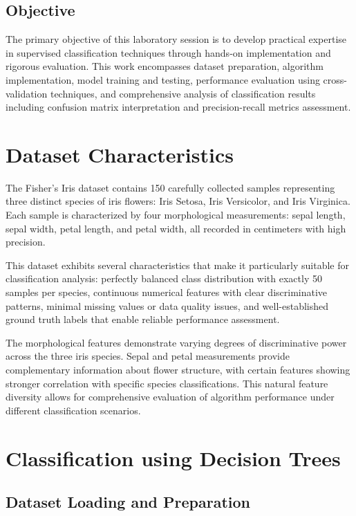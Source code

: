 \documentclass[12pt,a4paper]{article}
\begin{document}
\subsection{Objective}
The primary objective of this laboratory session is to develop practical expertise in supervised classification techniques through hands-on implementation and rigorous evaluation. This work encompasses dataset preparation, algorithm implementation, model training and testing, performance evaluation using cross-validation techniques, and comprehensive analysis of classification results including confusion matrix interpretation and precision-recall metrics assessment.
\section{Dataset Characteristics}

The Fisher's Iris dataset contains 150 carefully collected samples representing three distinct species of iris flowers: Iris Setosa, Iris Versicolor, and Iris Virginica. Each sample is characterized by four morphological measurements: sepal length, sepal width, petal length, and petal width, all recorded in centimeters with high precision.

This dataset exhibits several characteristics that make it particularly suitable for classification analysis: perfectly balanced class distribution with exactly 50 samples per species, continuous numerical features with clear discriminative patterns, minimal missing values or data quality issues, and well-established ground truth labels that enable reliable performance assessment.

The morphological features demonstrate varying degrees of discriminative power across the three iris species. Sepal and petal measurements provide complementary information about flower structure, with certain features showing stronger correlation with specific species classifications. This natural feature diversity allows for comprehensive evaluation of algorithm performance under different classification scenarios.

\section{Classification using Decision Trees}

\subsection{Dataset Loading and Preparation}
\end{document}
